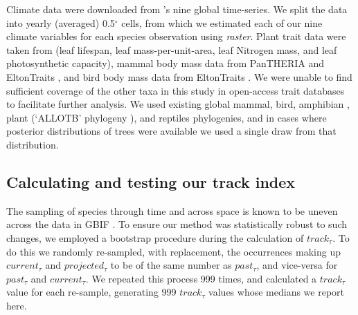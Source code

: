 \documentclass[12pt]{report}
\begin{document}
Climate data were downloaded from
\citeauthor{Harris2014}\supercite{Harris2014}'s nine global
time-series. We split the data into yearly (averaged) 0.5$^\circ$
cells, from which we estimated each of our nine climate variables for
each species observation using
\emph{raster}\supercite{Hijmans2019}. Plant trait data were taken from
\citeauthor{Wright2004}\supercite{Wright2004} (leaf lifespan, leaf
mass-per-unit-area, leaf Nitrogen mass, and leaf photosynthetic
capacity), mammal body mass data from PanTHERIA\supercite{Jones2009a}
and EltonTraits \supercite{Wilman2014}, and bird body mass data from
EltonTraits \supercite{Wilman2014}. We were unable to find sufficient
coverage of the other taxa in this study in open-access trait
databases to facilitate further analysis. We used existing global
mammal\supercite{Faurby2015}, bird\supercite{Jetz2012}, amphibian
\supercite{Jetz2018}, plant (`ALLOTB' phylogeny
\supercite{Smith2018}), and reptiles\supercite{Zheng2016} phylogenies,
and in cases where posterior distributions of trees were available we
used a single draw from that distribution.

\subsection*{Calculating and testing our track index}

The sampling of species through time and across space is known to be
uneven across the data in GBIF \supercite{Beck2013,Beck2014}. To
ensure our method was statistically robust to such changes, we
employed a bootstrap procedure during the calculation of
$track_\tau$. To do this we randomly re-sampled, with replacement, the
occurrences making up $current_\tau$ and $projected_\tau$ to be of the
same number as $past_\tau$, and vice-versa for $past_\tau$ and
$current_\tau$. We repeated this process 999 times, and calculated a
$track_\tau$ value for each re-sample, generating 999 $track_\tau$
values whose medians we report here.
\end{document}
